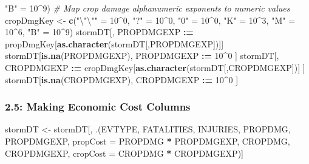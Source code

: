 \documentclass[
]{article}
\newenvironment{Shaded}{\begin{snugshade}}{\end{snugshade}}
\newcommand{\CharTok}[1]{\textcolor[rgb]{0.31,0.60,0.02}{#1}}
\newcommand{\CommentTok}[1]{\textcolor[rgb]{0.56,0.35,0.01}{\textit{#1}}}
\newcommand{\DataTypeTok}[1]{\textcolor[rgb]{0.13,0.29,0.53}{#1}}
\newcommand{\DecValTok}[1]{\textcolor[rgb]{0.00,0.00,0.81}{#1}}
\newcommand{\ErrorTok}[1]{\textcolor[rgb]{0.64,0.00,0.00}{\textbf{#1}}}
\newcommand{\KeywordTok}[1]{\textcolor[rgb]{0.13,0.29,0.53}{\textbf{#1}}}
\newcommand{\NormalTok}[1]{#1}
\newcommand{\OperatorTok}[1]{\textcolor[rgb]{0.81,0.36,0.00}{\textbf{#1}}}
\newcommand{\StringTok}[1]{\textcolor[rgb]{0.31,0.60,0.02}{#1}}
\begin{document}
\begin{Shaded}
\begin{Highlighting}[]
                 \StringTok{"B"}\NormalTok{ =}\StringTok{ }\DecValTok{10}\OperatorTok{^}\DecValTok{9}\NormalTok{)}
\CommentTok{# Map crop damage alphanumeric exponents to numeric values}
\NormalTok{cropDmgKey <-}\StringTok{  }\KeywordTok{c}\NormalTok{(}\StringTok{"}\CharTok{\textbackslash{}"\textbackslash{}"}\StringTok{"}\NormalTok{ =}\StringTok{ }\DecValTok{10}\OperatorTok{^}\DecValTok{0}\NormalTok{,}
                \StringTok{"?"}\NormalTok{ =}\StringTok{ }\DecValTok{10}\OperatorTok{^}\DecValTok{0}\NormalTok{, }
                \StringTok{"0"}\NormalTok{ =}\StringTok{ }\DecValTok{10}\OperatorTok{^}\DecValTok{0}\NormalTok{,}
                \StringTok{"K"}\NormalTok{ =}\StringTok{ }\DecValTok{10}\OperatorTok{^}\DecValTok{3}\NormalTok{,}
                \StringTok{"M"}\NormalTok{ =}\StringTok{ }\DecValTok{10}\OperatorTok{^}\DecValTok{6}\NormalTok{,}
                \StringTok{"B"}\NormalTok{ =}\StringTok{ }\DecValTok{10}\OperatorTok{^}\DecValTok{9}\NormalTok{)}
\NormalTok{stormDT[, PROPDMGEXP }\OperatorTok{:}\ErrorTok{=}\StringTok{ }\NormalTok{propDmgKey[}\KeywordTok{as.character}\NormalTok{(stormDT[,PROPDMGEXP])]]}
\NormalTok{stormDT[}\KeywordTok{is.na}\NormalTok{(PROPDMGEXP), PROPDMGEXP }\OperatorTok{:}\ErrorTok{=}\StringTok{ }\DecValTok{10}\OperatorTok{^}\DecValTok{0}\NormalTok{ ]}
\NormalTok{stormDT[, CROPDMGEXP }\OperatorTok{:}\ErrorTok{=}\StringTok{ }\NormalTok{cropDmgKey[}\KeywordTok{as.character}\NormalTok{(stormDT[,CROPDMGEXP])] ]}
\NormalTok{stormDT[}\KeywordTok{is.na}\NormalTok{(CROPDMGEXP), CROPDMGEXP }\OperatorTok{:}\ErrorTok{=}\StringTok{ }\DecValTok{10}\OperatorTok{^}\DecValTok{0}\NormalTok{ ]}
\end{Highlighting}
\end{Shaded}

\hypertarget{making-economic-cost-columns}{%
\subsubsection{2.5: Making Economic Cost
Columns}\label{making-economic-cost-columns}}

\begin{Shaded}
\begin{Highlighting}[]
\NormalTok{stormDT <-}\StringTok{ }\NormalTok{stormDT[, .(EVTYPE, FATALITIES, INJURIES, PROPDMG, PROPDMGEXP, }\DataTypeTok{propCost =}\NormalTok{ PROPDMG }\OperatorTok{*}\StringTok{ }\NormalTok{PROPDMGEXP, CROPDMG, CROPDMGEXP, }\DataTypeTok{cropCost =}\NormalTok{ CROPDMG }\OperatorTok{*}\StringTok{ }\NormalTok{CROPDMGEXP)]}
\end{Highlighting}
\end{Shaded}
\end{document}
